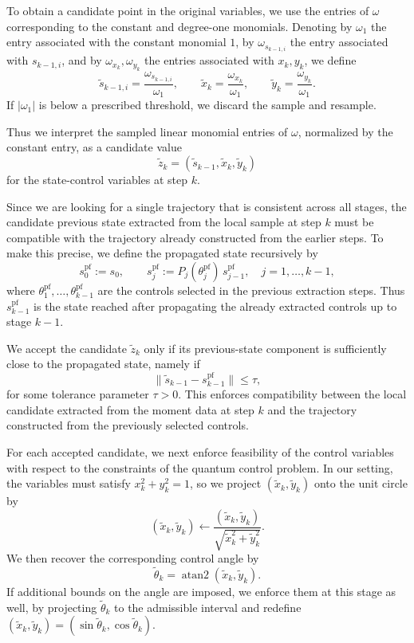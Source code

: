 \documentclass[11pt,a4paper]{article}
\theoremstyle{definition}
\begin{document}
To obtain a candidate point in the original variables, we use the entries of \(\omega\) corresponding to the constant and degree-one monomials. Denoting by \(\omega_1\) the entry associated with the constant monomial \(1\), by \(\omega_{s_{k-1,i}}\) the entry associated with \(s_{k-1,i}\), and by \(\omega_{x_k},\omega_{y_k}\) the entries associated with \(x_k,y_k\), we define
\[
\widetilde s_{k-1,i}=\frac{\omega_{s_{k-1,i}}}{\omega_1},\qquad
\widetilde x_k=\frac{\omega_{x_k}}{\omega_1},\qquad
\widetilde y_k=\frac{\omega_{y_k}}{\omega_1}.
\]
If $|\omega_1|$ is below a prescribed threshold, we discard the sample and resample.

Thus we interpret the sampled linear monomial entries of \(\omega\), normalized by the constant entry, as a candidate value
\[
\widetilde z_k=(\widetilde s_{k-1},\widetilde x_k,\widetilde y_k)
\]
for the state-control variables at step \(k\).

Since we are looking for a single trajectory that is consistent across all stages, the candidate previous state extracted from the local sample at step $k$ must be compatible with the trajectory already constructed from the earlier steps. To make this precise, we define the propagated state recursively by
\[
s_0^{\mathrm{pf}} := s_0,
\qquad
s_j^{\mathrm{pf}} := P_j(\theta_j^{\mathrm{pf}})\, s_{j-1}^{\mathrm{pf}},
\quad j=1,\dots,k-1,
\]
where \(\theta_1^{\mathrm{pf}},\dots,\theta_{k-1}^{\mathrm{pf}}\) are the controls selected in the previous extraction steps. Thus \(s_{k-1}^{\mathrm{pf}}\) is the state reached after propagating the already extracted controls up to stage \(k-1\).

We accept the candidate $\widetilde{z}_k$ only if its previous-state component is sufficiently close to the propagated state, namely if
\[
\|\widetilde s_{k-1}-s_{k-1}^{\mathrm{pf}}\|\le \tau,
\]
for some tolerance parameter $\tau>0$. This enforces compatibility between the local candidate extracted from the moment data at step $k$ and the trajectory constructed from the previously selected controls.

For each accepted candidate, we next enforce feasibility of the control variables with respect to the constraints of the quantum control problem. In our setting, the variables must satisfy $x_k^2+y_k^2=1$, so we project $(\widetilde x_k,\widetilde y_k)$ onto the unit circle by
\[
(\widetilde x_k,\widetilde y_k)\leftarrow
\frac{(\widetilde x_k,\widetilde y_k)}
{\sqrt{\widetilde x_k^2+\widetilde y_k^2}}.
\]
We then recover the corresponding control angle by
\[
\widetilde\theta_k=\operatorname{atan2}(\widetilde x_k,\widetilde y_k).
\]
If additional bounds on the angle are imposed, we enforce them at this stage as well, by projecting $\widetilde\theta_k$ to the admissible interval and redefine $(\widetilde x_k,\widetilde y_k)=(\sin \widetilde\theta_k, \cos \widetilde\theta_k)$. 
\end{document}
